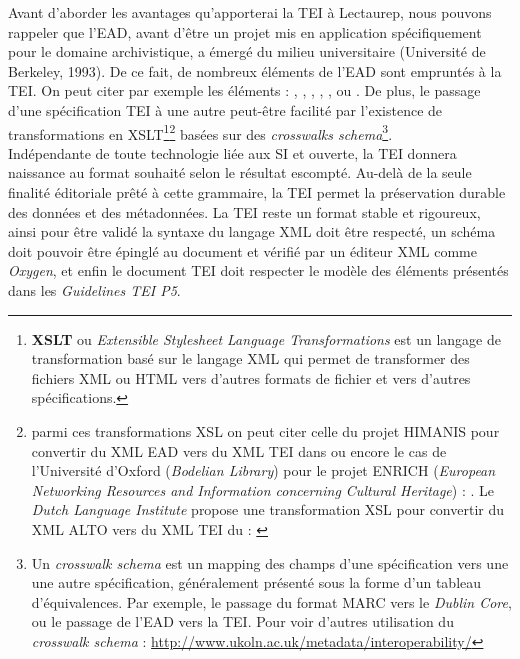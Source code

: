 \bigskip
Avant d'aborder les avantages qu'apporterai la TEI à Lectaurep, nous pouvons rappeler que l'EAD, avant d'être un projet mis en application spécifiquement pour le domaine archivistique, a émergé du milieu universitaire (Université de Berkeley, 1993). De ce fait, de nombreux éléments de l'EAD sont empruntés à la TEI. On peut citer par exemple les éléments  : , , , , , ou .
De plus, le passage d'une spécification TEI à une autre peut-être facilité par l'existence de transformations en XSLT\footnote{\textbf{XSLT} ou \textit{Extensible Stylesheet Language Transformations} est un langage de transformation basé sur le langage XML qui permet de transformer des fichiers XML ou HTML vers d'autres formats de fichier et vers d'autres spécifications.}\footnote{parmi ces transformations XSL on peut citer celle du projet HIMANIS pour convertir du XML EAD vers du XML TEI dans \cite{stutzmann_ead-tei_2019} ou encore le cas de l'Université d'Oxford (\textit{Bodelian Library}) pour le projet ENRICH (\textit{European Networking Resources and Information concerning Cultural Heritage}) : \cite{noauthor_ead2enrich_nodate}. Le \textit{Dutch Language Institute} propose une transformation XSL pour convertir du XML ALTO vers du XML TEI du : \cite{noauthor_alto2tei_nodate}} basées sur des \textit{crosswalks schema}\footnote{Un \textit{crosswalk schema} est un mapping des champs d'une spécification vers une une autre spécification, généralement présenté sous la forme d'un tableau d'équivalences. Par exemple, le passage du format MARC vers le \textit{Dublin Core}, ou le passage de l'EAD vers la TEI. Pour voir d'autres utilisation du \textit{crosswalk schema} : \url{http://www.ukoln.ac.uk/metadata/interoperability/}}.\\ 
 
Indépendante de toute technologie liée aux SI et ouverte, la TEI donnera naissance au format souhaité selon le résultat escompté. Au-delà de la seule finalité éditoriale prêté à cette grammaire, la TEI permet la préservation durable des données et des métadonnées. La TEI reste un format stable et rigoureux, ainsi pour être validé la syntaxe du langage XML doit être respecté, un schéma doit pouvoir être épinglé au document et vérifié par un éditeur XML comme \textit{Oxygen}, et enfin le document TEI doit respecter le modèle des éléments présentés dans les \textit{Guidelines TEI P5}.
\newpage
